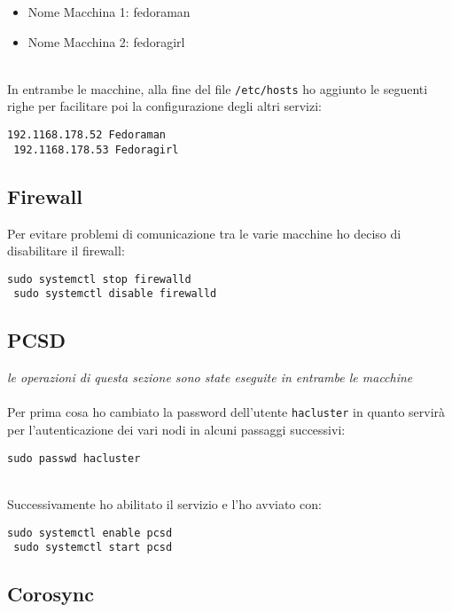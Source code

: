 \begin{itemize}
	\item Nome Macchina 1: fedoraman
	\item Nome Macchina 2: fedoragirl
\end{itemize}
\ \\
In entrambe le macchine, alla fine del file \lstinline[style=cmd]|/etc/hosts| ho aggiunto le seguenti righe per facilitare poi la configurazione degli altri servizi:

\begin{lstlisting}[style=cmd]
 192.1168.178.52 Fedoraman
 192.1168.178.53 Fedoragirl
\end{lstlisting}

\subsection{Firewall}

Per evitare problemi di comunicazione tra le varie macchine ho deciso di disabilitare il firewall:

\begin{lstlisting}[style=cmd]
 sudo systemctl stop firewalld
 sudo systemctl disable firewalld
\end{lstlisting}

\subsection{PCSD}
\label{sec:pcsd}
\textit{le operazioni di questa sezione sono state eseguite in entrambe le macchine }\\
\ \\
Per prima cosa ho cambiato la password dell'utente \lstinline[style=cmd]|hacluster| in quanto servir\`{a} per l'autenticazione dei vari nodi in alcuni passaggi successivi:

\begin{lstlisting}[style=cmd]
 sudo passwd hacluster
\end{lstlisting}
\ \\
Successivamente ho abilitato il servizio e l'ho avviato con:

\begin{lstlisting}[style=cmd]
 sudo systemctl enable pcsd
 sudo systemctl start pcsd
\end{lstlisting}
\pagebreak

\subsection{Corosync}


